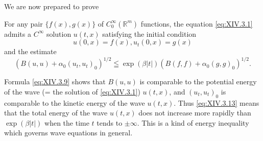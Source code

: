 We are now prepared to prove 

\begin{theoremu} For any pair $\{f(x), g(x)\}$ of $C_0^\infty(\mathbb{R}^{m})$ functions, the equation \eqref{eq:XIV.3.1} admits a $C^\infty$ solution $u(t, x)$ satisfying the initial condition 
\begin{equation}\label{eq:XIV.3.12}
u (0, x) = f (x), u _{t} (0, x) = g (x)
\end{equation}
and the estimate 
\begin{equation}\label{eq:XIV.3.13}
(B (u, u) + \alpha_{0} (u _{t}, u _{t}) _{0}) ^{1/2} \leqq \exp (\beta | t |) (B (f, f) + \alpha_{0} (g, g) _{0}) ^{1/2}.
\end{equation}
\end{theoremu}

\begin{remarku} Formula \eqref{eq:XIV.3.9} shows that $B(u, u)$ is comparable to the potential energy of the wave (= the solution of \eqref{eq:XIV.3.1}) $u(t, x)$, and $(u_t, u_t)_0$ is comparable to the kinetic energy of the wave $u(t, x)$. Thus \eqref{eq:XIV.3.13} means that the total energy of the wave $u(t, x)$ does not increase more rapidly than $\exp(\beta |t|)$ when the time $t$ tends to $\pm\infty$. This is a kind of energy inequality which governs wave equations in general. 
\end{remarku}

